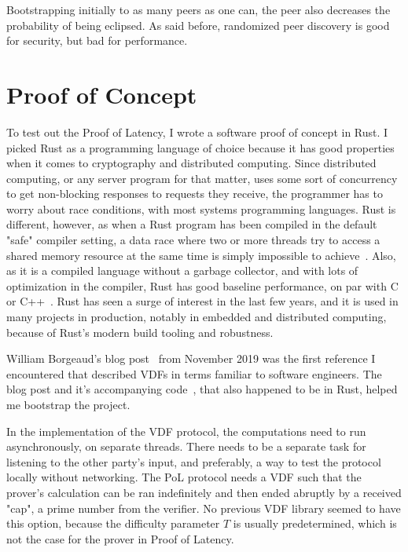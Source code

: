 Bootstrapping initially to as many peers as one can, the peer also decreases the probability of being eclipsed. As said before, randomized peer discovery is good for security, but bad for performance.

\chapter{Proof of Concept}
\label{Proof of Concept}
To test out the Proof of Latency, I wrote a software proof of concept in Rust. I picked Rust as a programming language of choice because it has good properties when it comes to cryptography and distributed computing. Since distributed computing, or any server program for that matter, uses some sort of concurrency to get non-blocking responses to requests they receive, the programmer has to worry about race conditions, with most systems programming languages. Rust is different, however, as when a Rust program has been compiled in the default "safe" compiler setting, a data race where two or more threads try to access a shared memory resource at the same time is simply impossible to achieve~\cite{The_Rust_Project_Developers2018-xh}. Also, as it is a compiled language without a garbage collector, and with lots of optimization in the compiler, Rust has good baseline performance, on par with C or C++~\cite{Howarth2020-zc}. Rust has seen a surge of interest in the last few years, and it is used in many projects in production, notably in embedded and distributed computing, because of Rust's modern build tooling and robustness.

William Borgeaud's blog post~\cite{Borgeaud2019-wk} from November 2019 was the first reference I encountered that described VDFs in terms familiar to software engineers. The blog post and it's accompanying code~\cite{Borgeaud2019-wk}, that also happened to be in Rust, helped me bootstrap the project.

In the implementation of the VDF protocol, the computations need to run asynchronously, on separate threads. There needs to be a separate task for listening to the other party's input, and preferably, a way to test the protocol locally without networking. The PoL protocol needs a VDF such that the prover's calculation can be ran indefinitely and then ended abruptly by a received "cap", a prime number from the verifier. No previous VDF library seemed to have this option, because the difficulty parameter \(T\) is usually predetermined, which is not the case for the prover in Proof of Latency.

